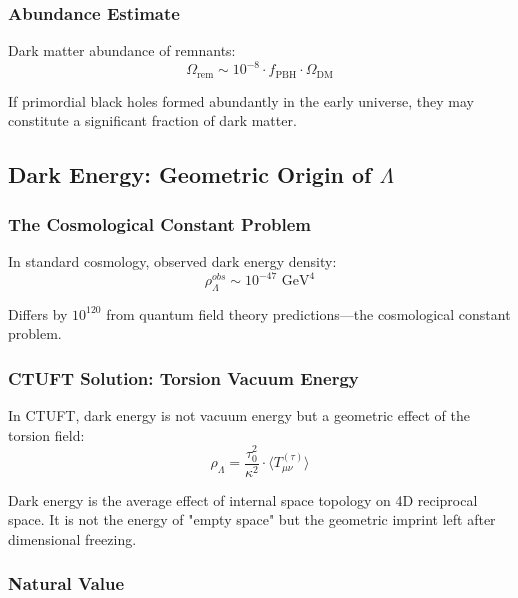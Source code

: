 \subsubsection{Abundance Estimate}

Dark matter abundance of remnants:
\begin{equation}
    \Omega_{\text{rem}} \sim 10^{-8} \cdot f_{\text{PBH}} \cdot \Omega_{\text{DM}}
\end{equation}

If primordial black holes formed abundantly in the early universe, they may constitute a significant fraction of dark matter.

\subsection{Dark Energy: Geometric Origin of $\Lambda$}

\subsubsection{The Cosmological Constant Problem}

In standard cosmology, observed dark energy density:
\begin{equation}
    \rho_\Lambda^{obs} \sim 10^{-47} \text{ GeV}^4
\end{equation}

Differs by $10^{120}$ from quantum field theory predictions—the cosmological constant problem.

\subsubsection{CTUFT Solution: Torsion Vacuum Energy}

In CTUFT, dark energy is not vacuum energy but a geometric effect of the torsion field:
\begin{equation}
    \rho_\Lambda = \frac{\tau_0^2}{\kappa^2} \cdot \langle T_{\mu\nu}^{(\tau)} \rangle
\end{equation}

\begin{insight}
Dark energy is the average effect of internal space topology on 4D reciprocal space. It is not the energy of "empty space" but the geometric imprint left after dimensional freezing.
\end{insight}

\subsubsection{Natural Value}

